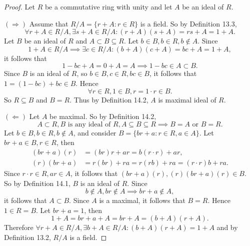 \documentclass{article}
\newtheorem{theorem}{Theorem}[section]
\theoremstyle{definition}
\begin{document}
\noindent{}

\begin{proof}
     Let $R$ be a commutative ring with unity and let $A$ be an ideal of $R$. 
     
     $(\Rightarrow)$ Assume that $R/A=\{r+A:r\in R\}$ is a field. So by Definition 13.3, 
     \begin{equation*}
         \forall r+A\in R/A, \exists s+A\in R/A: (r+A)(s+A)=rs+A=1+A.
     \end{equation*}
      Let $B$ be an ideal of $R$ and $A\subset B\subseteq R$. Let $b\in B, b\in R, b\notin A$. Since 
      \begin{equation*}
          1+A\in R/A \implies \exists c\in R/A:(b+A)(c+A)=bc+A=1+A,
      \end{equation*}
      it follows that
      \begin{equation*}
          1-bc+A=0+A=A \implies 1-bc\in A \subset B.
      \end{equation*}
      Since $B$ is an ideal of $R$, so $b\in B, c\in R, bc\in B$, it follows that $1=(1-bc)+bc\in B$. Hence
      \begin{equation*}
          \forall r \in R, 1 \in B, r=1\cdot r\in B.
      \end{equation*}
      So $R \subseteq B$ and $B=R$. Thus by Definition 14.2, $A$ is maximal ideal of $R$.
      
      $(\Leftarrow)$ Let $A$ be maximal. So by Definition 14.2,
      \begin{equation*}
          A\subset R, B \text{ is any ideal of } R, A\subseteq B \subseteq R \implies B=A \text{ or } B=R.
      \end{equation*}
      Let $b\in B, b\in R, b\notin A$, and consider $B=\{br+a:r\in R, a\in A\}$. Let $br+a\in B, r\in R$, then
      \begin{align*}
          (br+a)(r)&=(br)r+ar=b(r\cdot r)+ar, \\
          (r)(br+a)&=r(br)+ra=r(rb)+ra=(r\cdot r)b+ra.
      \end{align*}
      Since $r\cdot r \in R, ar\in A$, it follows that $(br+a)(r),(r)(br+a)(r)\in B$. So by Definition 14.1, $B$ is an ideal of $R$. Since 
      \begin{equation*}
          b\notin A, br\notin A \implies br+a\notin A,
      \end{equation*}
      it follows that $A \subset B$. Since $A$ is a maximal, it follows that $B=R$. Hence $1\in R=B$. Let $br+a=1$, then
      \begin{equation*}
          1+A=br+a+A=br+A=(b+A)(r+A).
      \end{equation*}
      Therefore $\forall r+A\in R/A, \exists b+A\in R/A: (b+A)(r+A)=1+A$ and by Definition 13.2, $R/A$ is a field.
      

\end{proof}
\end{document}
